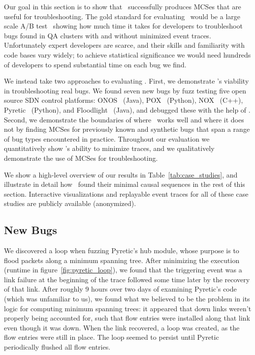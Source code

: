 Our goal in this section is to show that \projectname~successfully produces
MCSes that are useful for troubleshooting. The
gold standard for evaluating \projectname~would be a large scale A/B test~\cite{neyman}
showing how much time it takes for developers to troubleshoot bugs found in
QA clusters with and without minimized event traces. Unfortunately
expert developers are scarce, and their skills and familiarity
with code bases vary widely; to achieve statistical significance we would
need hundreds of developers to spend substantial time on each bug we find.

We instead take two approaches to evaluating \projectname.
First, we demonstrate \projectname's viability in
troubleshooting real bugs. We found \num{seven} new bugs by fuzz testing five open source
SDN control platforms:
ONOS~\cite{ONOS} (Java), POX~\cite{pox} (Python), NOX~\cite{nox} (C++),
Pyretic~\cite{frenetic} (Python), and Floodlight~\cite{bigswitch} (Java), and
debugged these with the help of \projectname. Second, we demonstrate the
boundaries of where \projectname~works well and where it does not by finding
MCSes for previously known and synthetic bugs that span a range of bug types encountered in
practice. Throughout our evaluation
we quantitatively show \projectname's ability to minimize traces, and we
qualitatively demonstrate the use of MCSes for troubleshooting.

We show a high-level overview
of our results in Table~\ref{tab:case_studies}, and
illustrate in detail how \projectname~found their minimal causal sequences
in the rest of this section. Interactive visualizations and replayable event traces
for all of these case studies are publicly available (anonymized).

\subsection{New Bugs}

 We discovered a loop when fuzzing Pyretic's hub
module, whose purpose is to flood packets along a minimum spanning tree. After
minimizing the execution (runtime in figure~\ref{fig:pyretic_loop}), we found that the triggering event
was a link failure at the beginning of the trace followed some time later by
the recovery of that link. After roughly 9 hours over two days of examining
Pyretic's code (which was unfamiliar to us), we found what we believed to be the problem
in its logic for computing minimum spanning trees: it appeared that down links
weren't properly being accounted for, such that flow entries were installed
along that link even though it was down. When the link recovered, a loop was
created, as the flow entries were still in place. The loop seemed to persist until
Pyretic periodically flushed all flow entries.

